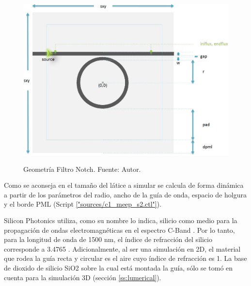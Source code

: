 \begin{figure}[H]
\caption{Geometría Filtro Notch. Fuente: Autor.}
\centering
\includegraphics[width=1.0\textwidth,natwidth=892,natheight=663]{figs/notch_v2.jpg}
\label{fig:notch_geometry}
\end{figure}

Como se aconseja en \cite{MIT_tuto} 
el tamaño del látice a simular se calcula 
de forma dinámica a partir de los parámetros del radio, ancho de la guía de onda, 
espacio de holgura y el borde PML (Script \ref{"sources/c1_meep_s2.ctl"}). 

Silicon Photonics utiliza, como su nombre lo indica, silicio como medio para la propagación de ondas electromagnéticas en el espectro C-Band . 
Por lo tanto, para la longitud de onda de 1500 nm, el índice de refracción del silicio corresponde a 3.4765 \cite{bass2009handbook}. 
Adicionalmente, al ser una simulación en 2D, el material que rodea la guía recta y circular es el aire cuyo índice de refracción es 1. 
La base de dioxido de silicio SiO2 sobre la cual está montada la guía, sólo se tomó en cuenta para la simulación 3D (sección \ref{ss:lumerical}).


